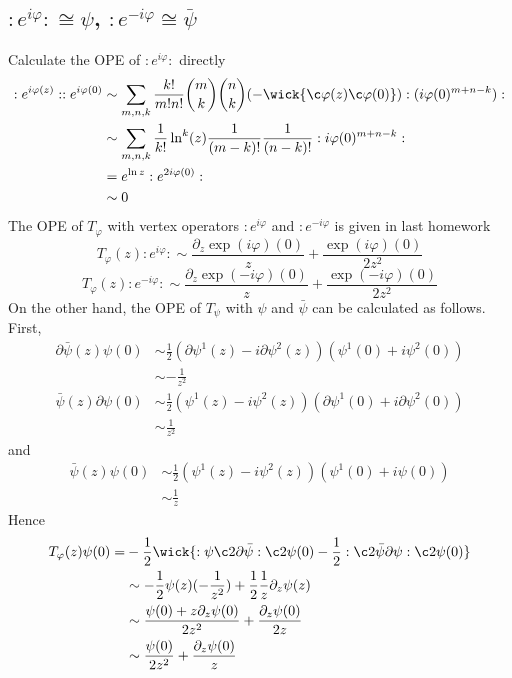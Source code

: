\subsection{$:e^{i\varphi}: \cong \psi$, $:e^{-i\varphi} \cong \bar{\psi}$}
Calculate the OPE of $:e^{i \varphi}:$ directly
\[
\begin{aligned}
:e^{i\varphi(z)}::e^{i\varphi(0)} &\sim\sum_{m,n,k} \frac{k!}{m!n!}\binom{m}{k}\binom{n}{k} (-\wick{\c\varphi(z)\c\varphi(0)}):(i\varphi(0)^{m+n-k}):\\
& \sim \sum_{m,n,k} \frac{1}{k!}\ln^k(z) \frac{1}{(m-k)!}\frac{1}{(n-k)!}:i\varphi(0)^{m+n-k}:\\
&= e^{\ln z} : e^{2i\varphi(0)}:\\
&\sim 0
\end{aligned}
\]
The OPE of $T_\varphi$ with vertex operators $:e^{i\varphi}$ and $:e^{-i\varphi}$ is given in last homework
\[
T_\varphi (z) :e^{i \varphi}: \sim \frac{\partial_z \exp(i\varphi)(0)}{z} +\frac{\exp(i\varphi)(0)}{2z^2}
\]
\[
T_\varphi (z) :e^{-i \varphi}: \sim \frac{\partial_z \exp(-i\varphi)(0)}{z} +\frac{\exp(-i\varphi)(0)}{2z^2}
\]
On the other hand, the OPE of $T_\psi$ with $\psi$ and $\bar\psi$ can be calculated as follows.
First,
\[
\begin{aligned}
\partial\bar{\psi}(z) \psi(0) &\sim \frac{1}{2}(\partial\psi^1(z) - i \partial\psi^2(z))(\psi^1(0)+ i \psi^2(0))\\
& \sim - \frac{1}{z^2}
\end{aligned}
\]
\[
\begin{aligned}
\bar{\psi}(z) \partial\psi(0) &\sim \frac{1}{2}(\psi^1(z) - i \psi^2(z))(\partial\psi^1(0)+ i \partial\psi^2(0))\\
& \sim \frac{1}{z^2}
\end{aligned}
\]
and
\[
\begin{aligned}
 \bar{\psi}(z)\psi(0) & \sim \frac{1}{2} (\psi^1(z) - i\psi^2(z) )(\psi^1(0)+ i\psi(0))\\
 & \sim \frac{1}{z}
\end{aligned}
\]
Hence
\[
\begin{aligned}
T_\varphi(z) \psi(0) =& - \frac{1}{2}\wick{:\psi  \c2{\partial\bar{\psi}}:\c2\psi(0) - \frac{1}{2}: \c2{\bar{\psi}} \partial \psi: \c2 \psi(0)}\\
&\sim - \frac{1}{2}\psi(z)(-\frac{1}{z^2}) + \frac{1}{2} \frac{1}{z} \partial_z\psi(z)\\
&\sim \frac{\psi(0)+ z\partial_z \psi(0)}{2 z^2} + \frac{\partial_z \psi(0)}{2z}\\
&\sim \frac{\psi(0)}{2z^2} + \frac{\partial_z \psi(0)}{z}
\end{aligned}
\]


